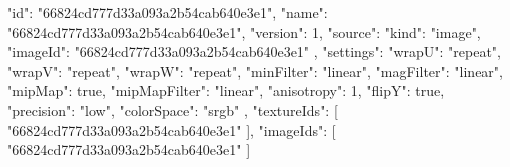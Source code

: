 {
  "id": "66824cd777d33a093a2b54cab640e3e1",
  "name": "66824cd777d33a093a2b54cab640e3e1",
  "version": 1,
  "source": {
    "kind": "image",
    "imageId": "66824cd777d33a093a2b54cab640e3e1"
  },
  "settings": {
    "wrapU": "repeat",
    "wrapV": "repeat",
    "wrapW": "repeat",
    "minFilter": "linear",
    "magFilter": "linear",
    "mipMap": true,
    "mipMapFilter": "linear",
    "anisotropy": 1,
    "flipY": true,
    "precision": "low",
    "colorSpace": "srgb"
  },
  "textureIds": [
    "66824cd777d33a093a2b54cab640e3e1"
  ],
  "imageIds": [
    "66824cd777d33a093a2b54cab640e3e1"
  ]
}
